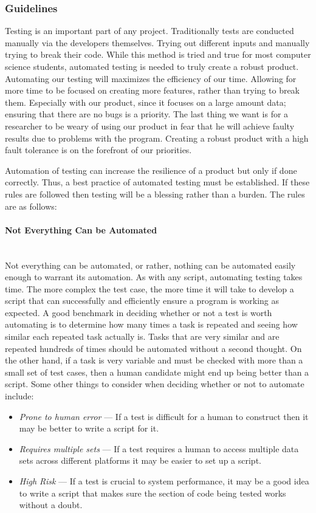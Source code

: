 \subsubsection{Guidelines}
Testing is an important part of any project. Traditionally tests are conducted manually via the developers themselves. Trying out different inputs and manually trying to break their code. While this method is tried and true for most computer science students, automated testing is needed to truly create a robust product. Automating our testing will maximizes the efficiency of our time. Allowing for more time to be focused on creating more features, rather than trying to break them. Especially with our product, since it focuses on a large amount data; ensuring that there are no bugs is a priority. The last thing we want is for a researcher to be weary of using our product in fear that he will achieve faulty results due to problems with the program. Creating a robust product with a high fault tolerance is on the forefront of our priorities.\par
Automation of testing can increase the resilience of a product but only if done correctly. Thus, a best practice of automated testing must be established. If these rules are followed then testing will be a blessing rather than a burden. The rules are as follows:

\paragraph{Not Everything Can be Automated} \mbox{}\\[\paragraphheaderspace]
Not everything can be automated, or rather, nothing can be automated easily enough to warrant its automation. As with any script, automating testing takes time. The more complex the test case, the more time it will take to develop a script that can successfully and efficiently ensure a program is working as expected. A good benchmark in deciding whether or not a test is worth automating is to determine how many times a task is repeated and seeing how similar each repeated task actually is. Tasks that are very similar and are repeated hundreds of times should be automated without a second thought. On the other hand, if a task is very variable and must be checked with more than a small set of test cases, then a human candidate might end up being better than a script. Some other things to consider when deciding whether or not to automate include:
\begin{itemize}
  \item \textit{Prone to human error} --- If a test is difficult for a human to construct then it may be better to write a script for it.
  \item \textit{Requires multiple sets} --- If a test requires a human to access multiple data sets across different platforms it may be easier to set up a script.
  \item \textit{High Risk} --- If a test is crucial to system performance, it may be a good idea to write a script that makes sure the section of code being tested works without a doubt.
\end{itemize}

